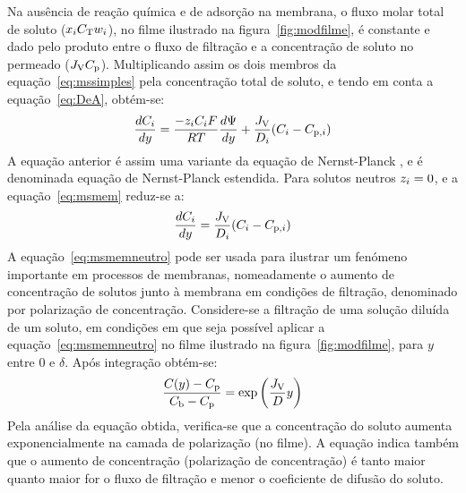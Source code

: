 Na ausência de reação química e de adsorção na membrana, o fluxo molar total de soluto ($x_iC_{\mathrm{T}} w_i$), no filme ilustrado na figura~\ref{fig:modfilme}, é constante e dado pelo produto entre o fluxo de filtração e a concentração de soluto no permeado ($J_{\mathrm{V}}C_{\mathrm{p}}$). 
Multiplicando assim os dois membros da equação~\ref{eq:mssimples} pela concentração total de soluto, e tendo em conta a equação~\ref{eq:DeA}, obtém-se:   
\begin{equation}
	\label{eq:msmem}
	\frac{dC_i}{dy}=\frac{-z_{i}C_iF}{R T}\frac{d\Psi}{dy}+\frac{J_{\mathrm{V}}}{D_{i}}(C_i-C_{\mathrm{p},i})
\end{equation}%
A equação anterior é assim uma variante da equação de Nernst-Planck \cite{taylor}, e é denominada equação de Nernst-Planck estendida.
%
Para solutos neutros $z_{i}=0$, e a equação~\ref{eq:msmem} reduz-se a:
\begin{equation}
	\label{eq:msmemneutro}
	\frac{dC_i}{dy}=\frac{J_{\mathrm{V}}}{D_{i}}(C_{i}-C_{\mathrm{p},i})
\end{equation}%
A equação~\ref{eq:msmemneutro} pode ser usada para ilustrar um fenómeno importante em processos de membranas, nomeadamente o aumento de concentração de solutos junto à membrana em condições de filtração, denominado por polarização de concentração. Considere-se a filtração de uma solução diluída de um soluto, em condições em que seja possível aplicar a equação~\ref{eq:msmemneutro} no filme ilustrado na figura~\ref{fig:modfilme}, para $y$ entre 0 e $\delta$. Após integração obtém-se:
\begin{equation}
	\label{eq:cnofilme}
	\frac{C(y)-C_{\mathrm{p}}}{C_{\mathrm{b}}-C_{\mathrm{p}}}=\exp\left( \frac{J_{\mathrm{V}}}{D} y\right)
\end{equation}%
Pela análise da equação obtida, verifica-se que a concentração do soluto aumenta exponencialmente na camada de polarização (no filme). A equação indica também que o aumento de concentração (polarização de concentração) é tanto maior quanto maior for o fluxo de filtração e menor o coeficiente de difusão do soluto.

